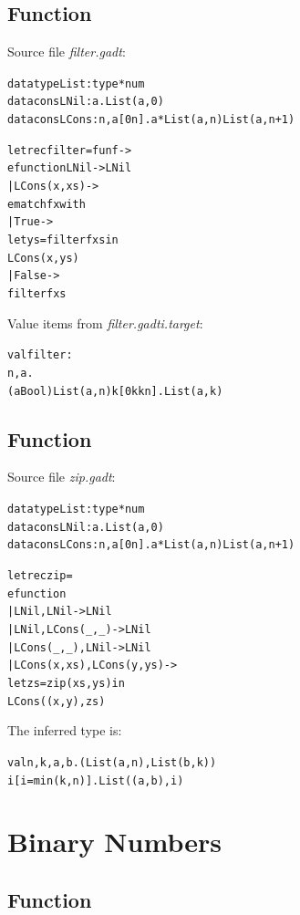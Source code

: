 \documentclass{article}
\newcommand{\tmem}[1]{{\em #1\/}}
\newcommand{\tmverbatim}[1]{{\ttfamily{#1}}}
\newenvironment{tmcode}[1][]{\begin{alltt}}{\end{alltt}}
\begin{document}
\subsection{Function \tmverbatim{filter}}

Source file {\tmem{filter.gadt}}:
\begin{tmcode}
datatype List : type * num
datacons LNil : a. List(a, 0)
datacons LCons : n, a [0n]. a * List(a, n)  List(a, n+1)

let rec filter = fun f ->
  efunction LNil -> LNil
    | LCons (x, xs) ->
      ematch f x with
        | True ->
          let ys = filter f xs in
          LCons (x, ys)
        | False ->
          filter f xs
\end{tmcode}
Value items from {\tmem{filter.gadti.target}}:
\begin{tmcode}
val filter :
   n, a.
   (a  Bool)  List (a, n)  k[0  k  k  n].List (a, k)
\end{tmcode}

\subsection{Function \tmverbatim{zip}}

Source file {\tmem{zip.gadt}}:
\begin{tmcode}
datatype List : type * num
datacons LNil : a. List(a, 0)
datacons LCons : n, a [0n]. a * List(a, n)  List(a, n+1)

let rec zip =
  efunction
    | LNil, LNil -> LNil
    | LNil, LCons (_, _) -> LNil
    | LCons (_, _), LNil -> LNil
    | LCons (x, xs), LCons (y, ys) ->
      let zs = zip (xs, ys) in
      LCons ((x, y), zs)
\end{tmcode}
The inferred type is:
\begin{tmcode}
val n, k, a, b. (List (a, n), List (b, k)) 
                  i[i=min (k, n)].List ((a, b), i)
\end{tmcode}

\section{Binary Numbers}

\subsection{Function \tmverbatim{plus}}
\end{document}
